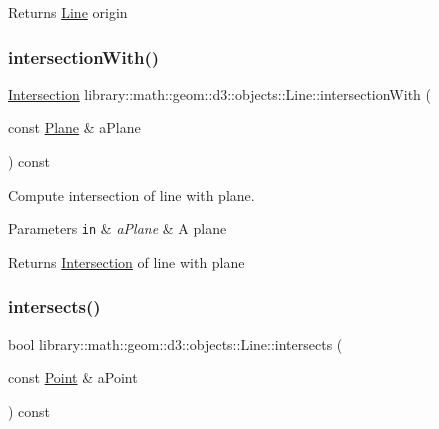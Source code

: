 \begin{DoxyReturn}{Returns}
\hyperlink{classlibrary_1_1math_1_1geom_1_1d3_1_1objects_1_1_line}{Line} origin 
\end{DoxyReturn}
\mbox{\label{classlibrary_1_1math_1_1geom_1_1d3_1_1objects_1_1_line_a422b904b4ec38d753ab7eed5b214f45a}} 
\subsubsection{\texorpdfstring{intersection\+With()}{intersectionWith()}}
{\footnotesize\ttfamily \hyperlink{classlibrary_1_1math_1_1geom_1_1d3_1_1_intersection}{Intersection} library\+::math\+::geom\+::d3\+::objects\+::\+Line\+::intersection\+With (\begin{DoxyParamCaption}\item[{const \hyperlink{classlibrary_1_1math_1_1geom_1_1d3_1_1objects_1_1_plane}{Plane} \&}]{a\+Plane }\end{DoxyParamCaption}) const}



Compute intersection of line with plane. 


\begin{DoxyParams}[1]{Parameters}
\mbox{\tt in}  & {\em a\+Plane} & A plane \\
\hline
\end{DoxyParams}
\begin{DoxyReturn}{Returns}
\hyperlink{classlibrary_1_1math_1_1geom_1_1d3_1_1_intersection}{Intersection} of line with plane 
\end{DoxyReturn}
\mbox{\label{classlibrary_1_1math_1_1geom_1_1d3_1_1objects_1_1_line_af40668ee33a6cd265a4b3c3a9a53f294}} 
\subsubsection{\texorpdfstring{intersects()}{intersects()}\hspace{0.1cm}{\footnotesize\ttfamily [1/4]}}
{\footnotesize\ttfamily bool library\+::math\+::geom\+::d3\+::objects\+::\+Line\+::intersects (\begin{DoxyParamCaption}\item[{const \hyperlink{classlibrary_1_1math_1_1geom_1_1d3_1_1objects_1_1_point}{Point} \&}]{a\+Point }\end{DoxyParamCaption}) const}



